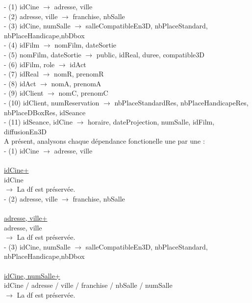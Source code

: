 \documentclass[a4paper,sffamily,12pt]{article}
\begin{document}
					\noindent- (1) idCine $\rightarrow$ adresse, ville \\
					- (2) adresse, ville $\rightarrow$ franchise, nbSalle \\
					- (3) idCine, numSalle $\rightarrow$ salleCompatibleEn3D, nbPlaceStandard, nbPlaceHandicape,nbDbox \\
			 		- (4) idFilm $\rightarrow$ nomFilm, dateSortie \\
					- (5) nomFilm, dateSortie $\rightarrow$ public, idReal, duree, compatible3D \\
					- (6) idFilm, role $\rightarrow$  idAct \\
					- (7) idReal $\rightarrow$ nomR, prenomR \\
					- (8) idAct $\rightarrow$ nomA, prenomA \\
					- (9) idClient $\rightarrow$ nomC, prenomC \\
					- (10) idClient, numReservation $\rightarrow$ nbPlaceStandardRes, nbPlaceHandicapeRes, nbPlaceDBoxRes, idSeance \\
					- (11) idSeance, idCine $\rightarrow$ horaire, dateProjection, numSalle, idFilm, diffusionEn3D \\
					
					\noindent A présent, analysons chaque dépendance fonctionelle une par une : \\
					
					\noindent - (1) idCine $\rightarrow$ adresse, ville \\
						\\
						\underline{idCine+} \\
						idCine\\									
					$\rightarrow$ La df est préservée. \\		
						
					\noindent - (2) adresse, ville $\rightarrow$ franchise, nbSalle \\
						\\
						\underline{adresse, ville+} \\
						adresse, ville \\									
					$\rightarrow$ La df est préservée. \\
					
					\noindent - (3) idCine, numSalle $\rightarrow$ salleCompatibleEn3D, nbPlaceStandard, nbPlaceHandicape,nbDbox \\
						\\
						\underline{idCine, numSalle+} \\
						idCine / adresse / ville / franchise / nbSalle / numSalle \\								
					$\rightarrow$ La df est préservée. \\													
	
\end{document}

